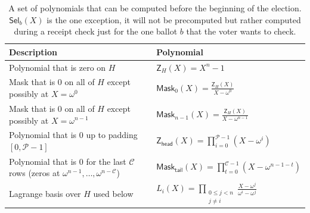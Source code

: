 

\begin{table}[t]
\small
\setlength{\tabcolsep}{5pt}
\renewcommand{\arraystretch}{1.15}
\caption{A set of polynomials that can be computed before the beginning of the election. $\mathsf{Sel}_{b}(X)$ is the one exception, it will not be precomputed but rather computed during a receipt check just for the one ballot $b$ that the voter wants to check.}
\label{tab:selectors}
\begin{tabular}{@{}p{0.6\linewidth}|p{0.4\linewidth}@{}}
\toprule
\textbf{Description} & \textbf{Polynomial} \\
\midrule

Polynomial that is zero on $H$ &
$\mathsf{Z}_H(X)=X^n-1$ \\



Mask that is $0$ on all of $H$ except possibly at $X=\omega^0$ &
$\mathsf{Mask}_{0}(X)=\displaystyle\frac{\mathsf{Z}_H(X)}{X-\omega^0}$ \\

Mask that is $0$ on all of $H$ except possibly at $X=\omega^{n-1}$ &
$\mathsf{Mask}_{n-1}(X)=\displaystyle\frac{\mathsf{Z}_H(X)}{X-\omega^{n-1}}$ \\ \hline

Polynomial that is 0 up to padding $[0,\mathcal{P}-1]$ &
$\mathsf{Z}_{\mathsf{head}}(X)=\displaystyle\prod_{i=0}^{\mathcal{P}-1}\left(X-\omega^i\right)$ \\

Polynomial that is 0 for the last $\mathcal{C}$ rows (zeros at $\omega^{n-1},\dots,\omega^{n-\mathcal{C}}$) &
$\mathsf{Mask}_{\mathsf{tail}}(X)=\displaystyle\prod_{t=0}^{\mathcal{C}-1}\left(X-\omega^{n-1-t}\right)$ \\ \hline


Lagrange basis over $H$ used below &
$L_i(X)=\displaystyle\prod_{\substack{0\le j<n\\ j\ne i}}\frac{X-\omega^j}{\omega^i-\omega^j}$ \\


\end{tabular}
\end{table}
